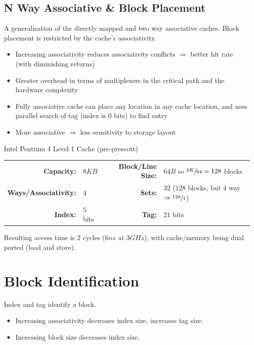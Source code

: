 \subsection{N Way Associative \& Block Placement}
A generalisation of the directly mapped and two way associative caches. Block placement is restricted by the cache's associativity.
\begin{itemize}
    \item Increasing associativity reduces associativity conflicts $\Rightarrow$ better hit rate (with diminishing returns)
    \item Greater overhead in terms of multiplexers in the critical path and the hardware complexity
    \item Fully associative cache can place any location in any cache location, and uses parallel search of tag (index is $0$ bits) to find entry
    \item More associative $\Rightarrow$ less sensitivity to storage layout
\end{itemize}
\begin{sidenotebox}{Intel Pentium 4 Level 1 Cache (pre-prescott)}
    \begin{center}
        \begin{tabular}{r l | r l}
            \textbf{Capacity:} & $8KB$ & \textbf{Block/Line Size:} & $64B$ so $\sfrac{8K}{64} = 128$ blocks\\
            \textbf{Ways/Associativity:} & $4$ & \textbf{Sets:} & $32$ ($128$ blocks, but $4$ way $\Rightarrow \sfrac{128}{4}$) \\
            \textbf{Index:} & $5$ bits & \textbf{Tag:} & $21$ bits \\
        \end{tabular}
    \end{center}
    Resulting access time is $2$ cycles ($6ns$ at $3GHz$), with cache/memory being dual ported (load and store).
\end{sidenotebox}

\section{Block Identification}
Index and tag identify a block.
\begin{itemize}
    \item Increasing associativity decreases index size, increases tag size.
    \item Increasing block size decreases index size.
\end{itemize}

